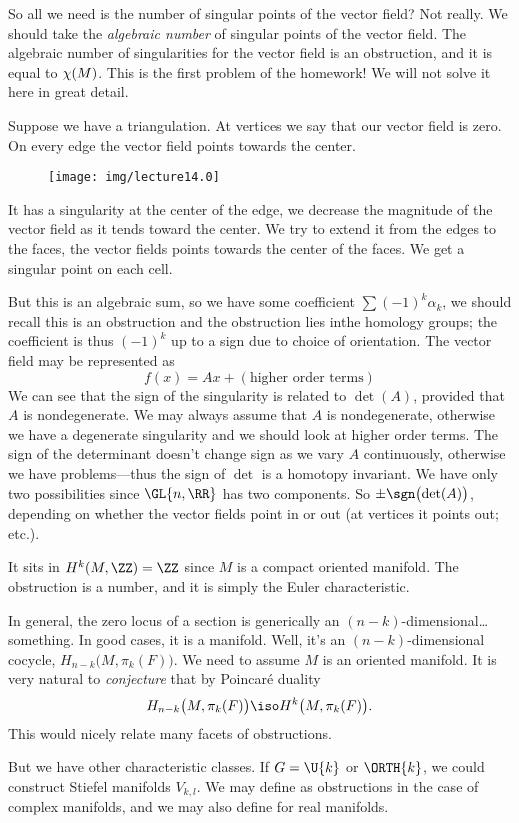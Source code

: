 So all we need is the number of singular points of the vector
field? Not really. We should take the \emph{algebraic number} of
singular points of the vector field. The algebraic number of
singularities for the vector field is an obstruction, and it is
equal to $\chi(M)$. This is the first problem of the
homework! We will not solve it here in great detail.

Suppose we have a triangulation. At vertices we say that our
vector field is zero. On every edge the vector field points
towards the center.

\begin{wrapfigure}[7]{r}{1in}
  \texttt{[image: img/lecture14.0]}
\end{wrapfigure}

It has a singularity at the center of the edge, we decrease the
magnitude of the vector field as it tends toward the center. We
try to extend it from the edges to the faces, the vector fields
points towards the center of the faces. We get a singular point
on each cell.

But this is an algebraic sum, so we have some coefficient
$\sum(-1)^{k}\alpha_{k}$, we should recall this is an obstruction
and the obstruction lies inthe homology groups; the coefficient
is thus $(-1)^{k}$ up to a sign due to choice of orientation. The
vector field may be represented as
\begin{equation}
f(x)=Ax+(\mbox{higher order terms})
\end{equation}
We can see that the sign of the singularity is related to
$\det(A)$, provided that $A$ is nondegenerate. We may always
assume that $A$ is nondegenerate, otherwise we have a degenerate
singularity and we should look at higher order terms. The sign of
the determinant doesn't change sign as we vary $A$ continuously,
otherwise we have problems---thus the sign of $\det$ is a homotopy invariant.
We have only two possibilities since $\GL{n,\RR}$ has two
components. So $\pm\sgn\bigl(\det(A)\bigr)$, depending on whether
the vector fields point in or out (at vertices it points out; etc.).

It sits in $H^k(M,\ZZ)=\ZZ$ since $M$ is a compact oriented
manifold. The obstruction is a number, and it is simply the Euler
characteristic.

In general, the zero locus of a section is generically an
$(n-k)$-dimensional\dots something. In good cases, it is a
manifold. Well, it's an $(n-k)$-dimensional cocycle,
$H_{n-k}\bigl(M,\pi_{k}(F)\bigr)$. We need to assume $M$ is an
oriented manifold. It is very natural to \emph{conjecture} that
by Poincar\'e duality
\begin{equation}
H_{n-k}\bigl(M,\pi_{k}(F)\bigr)\iso H^{k}\bigl(M,\pi_{k}(F)\bigr).
\end{equation}
This would nicely relate many facets of obstructions. 

But we have other characteristic classes. If $G=\U{k}$ or
$\ORTH{k}$, we could construct Stiefel manifolds $V_{k,l}$. We
may define  as obstructions in the case of
complex manifolds, and we may also define 
for real manifolds.
